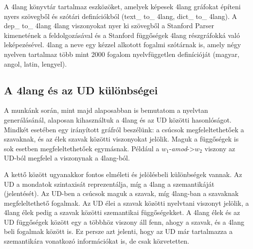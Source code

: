 A 4lang könyvtár tartalmaz eszközöket, amelyek képesek 4lang gráfokat építeni nyers szövegből és szótári definíciókból (text\_ to\_ 4lang, dict\_ to\_ 4lang). A dep\_ to\_ 4lang 4lang viszonyokat nyer ki szövegből a Stanford Parser \cite{deMarneffe:2008} kimenetének a feldolgozásával és a Stanford függőségek 4lang részgráfokká való leképezésével.
4lang a neve egy kézzel alkotott  fogalmi szótárnak is, amely négy nyelven tartalmaz több mint 2000 fogalom nyelvfüggetlen definícióját (magyar, angol, latin, lengyel). \cite{Kornai:2013}


\subsection{A 4lang és az UD különbségei}
\label{sec:4LvsUD}
A munkánk során, mint majd alaposabban is bemutatom a nyelvtan generálásánál, alaposan kihasználtuk a 4lang és az UD közötti hasonlóságot. Mindkét esetében egy irányított gráfról beszélünk: a csúcsok megfeleltethetőek a szavaknak, és az élek szavak közötti viszonyokat jelölik. Maguk a függőségek is sok esetben megfeleltethetőek egymásnak. Például a $w_1$-\textit{amod}->$w_2$ viszony az UD-ból megfelel a   viszonynak a 4lang-ból.

A kettő között ugyanakkor fontos elméleti és jelölésbeli különbségek vannak. Az UD a mondatok szintaxisát reprezentálja, míg a 4lang a szemantikáját (jelentését). Az UD-ben a csúcsok maguk a szavak, míg 4lang-ban a szavaknak megfeleltethető fogalmak. Az UD élei a szavak közötti nyelvtani viszonyt jelölik, a 4lang élek pedig a szavak közötti szemantikai függőségekket. A 4lang élek és az UD függőségek között egy a többhöz viszony áll fenn, ahogy a szavak, és a 4lang beli fogalmak között is. Ez persze azt jelenti, hogy az UD már tartalmazza a szemantikára vonatkozó információkat is, de csak közvetetten.

